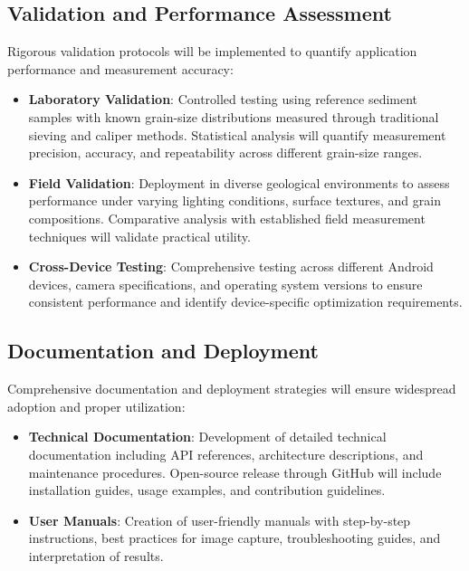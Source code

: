 \documentclass[project-plan]{report-template}
\begin{document}
\subsection{Validation and Performance Assessment}
Rigorous validation protocols will be implemented to quantify application performance and measurement accuracy:
\begin{itemize}
    \item \textbf{Laboratory Validation}: Controlled testing using reference sediment samples with known grain-size distributions measured through traditional sieving and caliper methods. Statistical analysis will quantify measurement precision, accuracy, and repeatability across different grain-size ranges.
\end{itemize}
\begin{itemize}
    \item \textbf{Field Validation}: Deployment in diverse geological environments to assess performance under varying lighting conditions, surface textures, and grain compositions. Comparative analysis with established field measurement techniques will validate practical utility.
\end{itemize}
\begin{itemize}
    \item \textbf{Cross-Device Testing}: Comprehensive testing across different Android devices, camera specifications, and operating system versions to ensure consistent performance and identify device-specific optimization requirements.
\end{itemize}

\subsection{ Documentation and Deployment}
Comprehensive documentation and deployment strategies will ensure widespread adoption and proper utilization:
\begin{itemize}
    \item \textbf{Technical Documentation}: Development of detailed technical documentation including API references, architecture descriptions, and maintenance procedures. Open-source release through GitHub will include installation guides, usage examples, and contribution guidelines.
\end{itemize}
\begin{itemize}
    \item \textbf{User Manuals}: Creation of user-friendly manuals with step-by-step instructions, best practices for image capture, troubleshooting guides, and interpretation of results.
\end{itemize}
\end{document}
